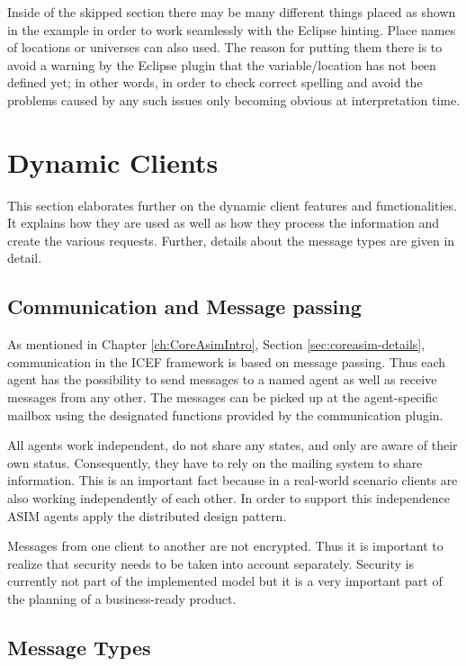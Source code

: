 Inside of the skipped section there may be many different things placed as shown in the example in order to work seamlessly with the Eclipse hinting. Place names of locations or universes can also used. The reason for putting them there is to avoid a warning by the Eclipse plugin that the variable/location has not been defined yet; in other words, in order to check correct spelling and avoid the problems caused by any such issues only becoming obvious at interpretation time.


\section{Dynamic Clients}
\label{sec:impl-dyn-clients}

This section elaborates further on the dynamic client features and functionalities. It explains how they are used as well as how they process the information and create the various requests. Further, details about the message types are given in detail.

\subsection{Communication and Message passing}
\label{sec:impl-com-msg}

As mentioned in Chapter \ref{ch:CoreAsimIntro}, Section \ref{sec:coreasim-details}, communication in the ICEF framework is based on message passing. Thus each agent has the possibility to send messages to a named agent as well as receive messages from any other. The messages can be picked up at the agent-specific mailbox using the designated functions provided by the communication plugin.

All agents work independent, do not share any states, and only are aware of their own status. Consequently, they have to rely on the mailing system to share information. This is an important fact because in a real-world scenario clients are also working independently of each other. In order to support this independence ASIM agents apply the distributed design pattern.

Messages from one client to another are not encrypted. Thus it is important to realize that security needs to be taken into account separately. Security is currently not part of the implemented model but it is a very important part of the planning of a business-ready product.

\subsection{Message Types}
\label{subsec:impl-msg-types}

